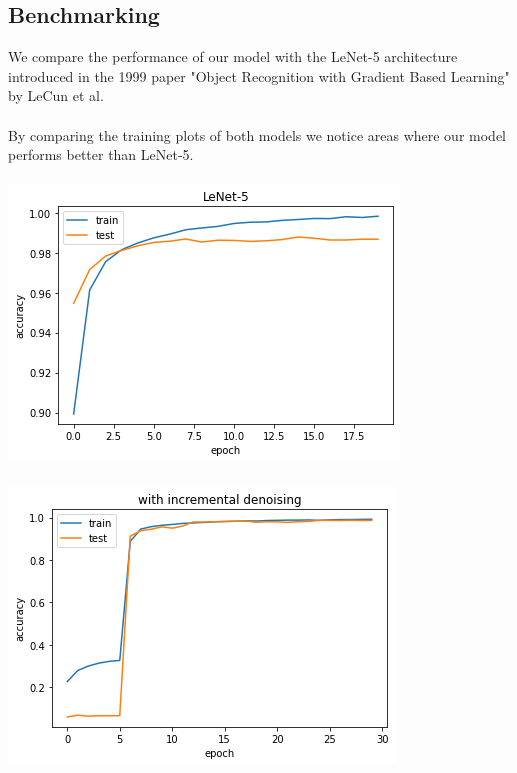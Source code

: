 \documentclass[12pt]{article}
\begin{document}
\begin{multicols}{2}
		\section{Benchmarking}
		We compare the performance of our model with the LeNet-5 architecture introduced in the 1999 paper "Object Recognition with Gradient Based Learning" by LeCun et al.
		\\\\
		By comparing the training plots of both models we notice areas where our model performs better than LeNet-5.
		\\\\
		\includegraphics[width=\linewidth]{assets/withoutdenoising.png}
		\\\\
		\includegraphics[width=\linewidth]{assets/withdenoising.png}
		

\end{multicols}
\end{document}
